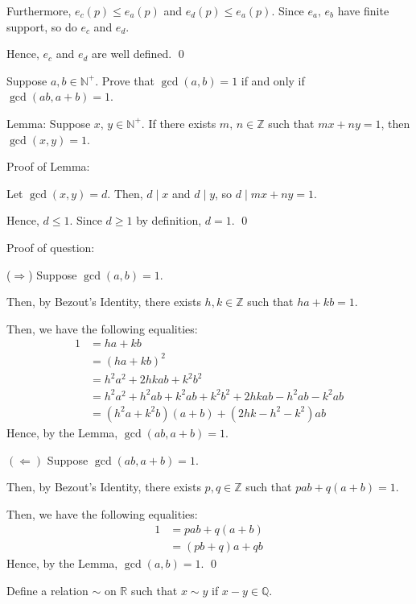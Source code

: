 \documentclass[a4paper, 11pt]{exam}
\newcommand{\solbox}[1]{\begin{EnvFullwidth}\begin{solution}#1\end{solution}\end{EnvFullwidth}}
\begin{document}
\begin{questions}
{Furthermore, \(e_c(p)\leq e_a(p)\) and \(e_d(p)\leq e_a(p)\). Since \(e_a,\,e_b\) have finite support, so do \(e_c\) and \(e_d\).

Hence, \(e_c\) and \(e_d\) are well defined. \qed
}
\clearpage
\question[3] Suppose \(a,b\in\mathbb{N}^+\). Prove that \(\gcd(a,b)=1\) if and only if \(\gcd(ab,a+b)=1\).
\solbox{
Lemma: Suppose \(x,\,y\in\mathbb{N}^+\). If there exists \(m,\,n\in\mathbb{Z}\) such that \(mx+ny=1\), then \(\gcd(x,y)=1\). 

Proof of Lemma:

Let \(\gcd(x,y)=d\). Then, \(d\mid x\) and \(d\mid y\), so \(d\mid mx+ny=1\).

Hence, \(d\leq 1\). Since \(d\geq 1\) by definition, \(d=1\). \qed

Proof of question:

(\(\Rightarrow\)) Suppose \(\gcd(a,b)=1\). 

Then, by Bezout's Identity, there exists \(h,k\in\mathbb{Z}\) such that \(ha+kb=1\). 

Then, we have the following equalities:
\begin{align*}
    1&=ha+kb\\
    &=(ha+kb)^2\\
    &=h^2a^2+2hkab+k^2b^2\\
    &=h^2a^2+h^2ab+k^2ab+k^2b^2+2hkab-h^2ab-k^2ab\\
    &=(h^2a+k^2b)(a+b)+(2hk-h^2-k^2)ab
\end{align*}
Hence, by the Lemma, \(\gcd(ab,a+b)=1\).

\((\Leftarrow)\) Suppose \(\gcd(ab,a+b)=1\). 

Then, by Bezout's Identity, there exists \(p,q\in\mathbb{Z}\) such that \(pab+q(a+b)=1\).

Then, we have the following equalities:
\begin{align*}
    1&=pab+q(a+b)\\
    &=(pb+q)a+qb
\end{align*}
Hence, by the Lemma, \(\gcd(a,b)=1\). \qed
}
\clearpage
\question Define a relation \(\sim\) on \(\mathbb{R}\) such that \(x\sim y\) if \(x-y\in\mathbb{Q}\).
\end{questions}
\end{document}
